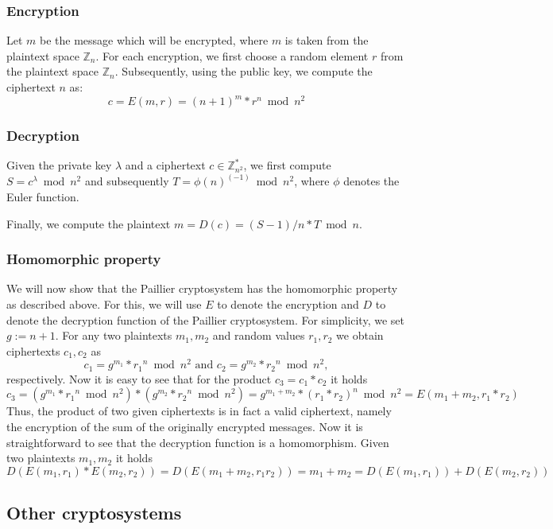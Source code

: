 \begin{bibunit}[babalpha]
\subsubsection{Encryption}

Let $m$ be the message which will be encrypted, where $m$ is taken from the plaintext space $\mathbb{Z}_n$. For each encryption, we first choose a random element $r$ from the plaintext space $\mathbb{Z}_n$. Subsequently, using the public key, we compute the ciphertext $n$ as:
%
$$c = E(m,r) = (n+1)^m  * r^n  \bmod n^2$$
%
\subsubsection{Decryption}

Given the private key $\lambda$ and a ciphertext $c \in \mathbb{Z}_{n^2}^*$, we first compute $S = c^\lambda \bmod n^2$ and subsequently $T = \phi(n)^{(-1)} \bmod n^2$, where $\phi$ denotes the Euler function.

Finally, we compute the plaintext $m = D(c) = (S-1)/n * T \bmod n$.

\subsubsection{Homomorphic property}

We will now show that the Paillier cryptosystem has the homomorphic property as described above. For this, we will use $E$ to denote the encryption and $D$ to denote the decryption function of the Paillier cryptosystem. For simplicity, we set $g:= n+1$.  For any two plaintexts $m_1,m_2$ and random values $r_1, r_2$ we obtain ciphertexts $c_1, c_2$ as
%
$$c_1 = g^{m_1} *  {r_1}^n \bmod n^2 \mbox{ and } c_2 = g^{m_2} * {r_2}^n \bmod n^2,$$
%
respectively. Now it is easy to see that for the product $c_3 = c_1 * c_2$ it holds
%
$$c_3 = (g^{m_1} * {r_1}^n \bmod n^2) * (g^{m_2} * {r_2}^n \bmod n^2) = g^{m_1+m_2} * (r_1*r_2 )^n \bmod n^2 = E(m_1 + m_2, r_1*r_2)$$
%
Thus, the product of two given ciphertexts is in fact a valid ciphertext, namely the encryption of the sum of the originally encrypted messages. Now it is straightforward to see that the decryption function is a homomorphism. Given two plaintexts $m_1, m_2$ it holds
%
$$D( E(m_1,r_1) * E(m_2,r_2)) = D( E(m_1+m_2, r_1 r_2)) = m_1  + m_2 = D(E(m_1,r_1)) + D(E(m_2,r_2))$$

\subsection{Other cryptosystems}


\end{bibunit}
